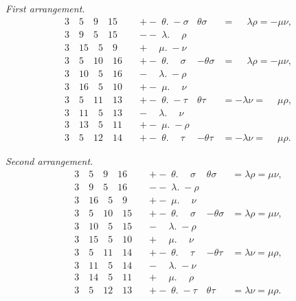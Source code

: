 \documentclass[11pt,a4paper]{book}
\begin{document}
\textit{First arrangement.}
\begin{align*}
3\quad 5\quad 9\quad 15\quad &+ -\; \theta.\; -\sigma & \theta\sigma &= \phantom{-}\lambda\rho = -\mu\nu, \\
3\quad 9\quad 5\quad 15\quad &--\; \lambda.\phantom{-}\rho & & \\
3\quad 15\quad 5\quad 9\quad &+\phantom{-}\mu.\; -\nu & & \\[4pt]
3\quad 5\quad 10\quad 16\quad &+ -\; \theta.\phantom{-}\sigma & -\theta\sigma &= \phantom{-}\lambda\rho = -\mu\nu, \\
3\quad 10\quad 5\quad 16\quad &-\phantom{-}\lambda.\; -\rho & & \\
3\quad 16\quad 5\quad 10\quad &+ -\; \mu.\phantom{-}\nu & & \\[4pt]
3\quad 5\quad 11\quad 13\quad &+ -\; \theta.\; -\tau & \theta\tau &= -\lambda\nu = \phantom{-}\mu\rho, \\
3\quad 11\quad 5\quad 13\quad &-\phantom{-}\lambda.\phantom{-}\nu & & \\
3\quad 13\quad 5\quad 11\quad &+ -\; \mu.\; -\rho & & \\[4pt]
3\quad 5\quad 12\quad 14\quad &+ -\; \theta.\phantom{-}\tau & -\theta\tau &= -\lambda\nu = \phantom{-}\mu\rho.
\end{align*}

\textit{Second arrangement.}
\begin{align*}
3\quad 5\quad 9\quad 16\quad &+ -\; \theta.\phantom{-}\sigma & \theta\sigma &= \lambda\rho = \mu\nu, \\
3\quad 9\quad 5\quad 16\quad &--\; \lambda.\; -\rho & & \\
3\quad 16\quad 5\quad 9\quad &+ -\; \mu.\phantom{-}\nu & & \\[4pt]
3\quad 5\quad 10\quad 15\quad &+ -\; \theta.\phantom{-}\sigma & -\theta\sigma &= \lambda\rho = \mu\nu, \\
3\quad 10\quad 5\quad 15\quad &-\phantom{-}\lambda.\; -\rho & & \\
3\quad 15\quad 5\quad 10\quad &+\phantom{-}\mu.\phantom{-}\nu & & \\[4pt]
3\quad 5\quad 11\quad 14\quad &+ -\; \theta.\phantom{-}\tau & -\theta\tau &= \lambda\nu = \mu\rho, \\
3\quad 11\quad 5\quad 14\quad &-\phantom{-}\lambda.\; -\nu & & \\
3\quad 14\quad 5\quad 11\quad &+\phantom{-}\mu.\phantom{-}\rho & & \\[4pt]
3\quad 5\quad 12\quad 13\quad &+ -\; \theta.\; -\tau & \theta\tau &= \lambda\nu = \mu\rho.
\end{align*}
\end{document}

